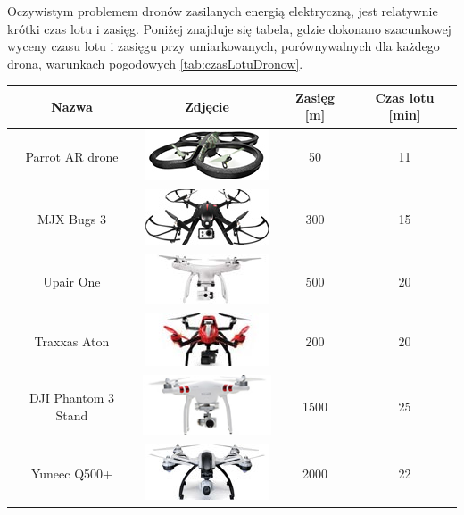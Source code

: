Oczywistym problemem dronów zasilanych energią elektryczną, jest relatywnie krótki czas lotu i zasięg. Poniżej znajduje się tabela, gdzie dokonano szacunkowej wyceny czasu lotu i zasięgu przy umiarkowanych, porównywalnych dla każdego drona, warunkach pogodowych \ref{tab:czasLotuDronow}.

\begin{longtable}{|c|c|c|c|} \hline
	    Nazwa & Zdjęcie & Zasięg [m] & Czas lotu [min] \\ \hline
    	    Parrot AR drone & \includegraphics{zalaczniki/obrazy/drony_miniaturki/parrot.jpg} & 50 & 11 \\ \hline
    	    MJX Bugs 3 & \includegraphics{zalaczniki/obrazy/drony_miniaturki/mjx.jpg} & 300 & 15 \\ \hline
    	    Upair One & \includegraphics{zalaczniki/obrazy/drony_miniaturki/upair.jpg} & 500 & 20 \\ \hline
    	    Traxxas Aton & \includegraphics{zalaczniki/obrazy/drony_miniaturki/TRAXXAS.jpg} & 200 & 20 \\ \hline
    	    DJI Phantom 3 Stand & \includegraphics{zalaczniki/obrazy/drony_miniaturki/dji-phantom-3-standard.jpg} & 1500 & 25 \\ \hline
    	    Yuneec Q500+ & \includegraphics{zalaczniki/obrazy/drony_miniaturki/yuneec.jpg} & 2000 & 22 \\ \hline

\end{longtable}
